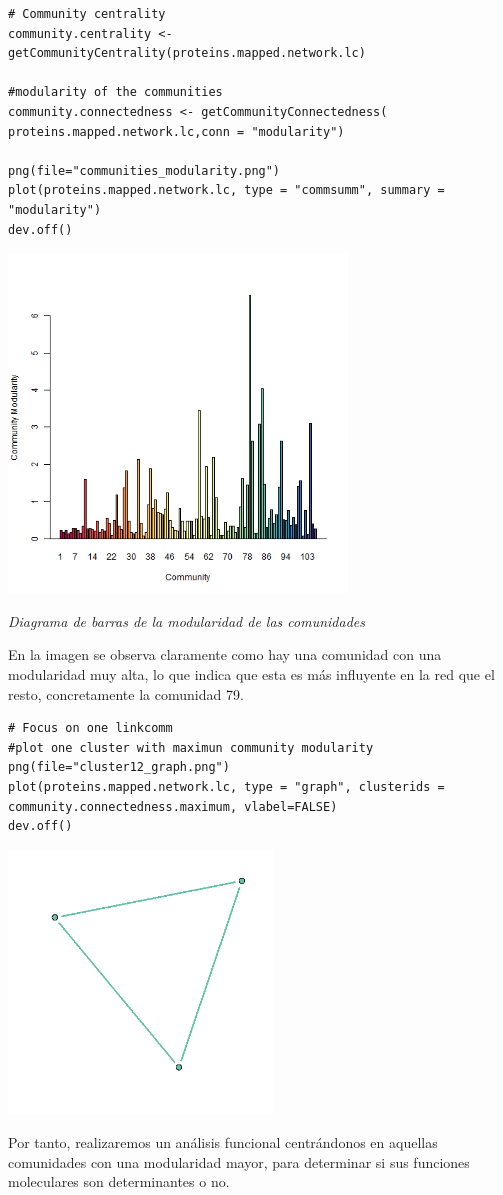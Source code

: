 \begin{lstlisting}
# Community centrality
community.centrality <- getCommunityCentrality(proteins.mapped.network.lc)

#modularity of the communities
community.connectedness <- getCommunityConnectedness(
proteins.mapped.network.lc,conn = "modularity") 

png(file="communities_modularity.png")
plot(proteins.mapped.network.lc, type = "commsumm", summary = "modularity")
dev.off()
\end{lstlisting}
\begin{center}
\includegraphics[width=90mm,scale=1]{report/figures/communities_modularity.png}

\caption{\textit{Diagrama de barras de la modularidad de las comunidades}}

\end{center}
En la imagen se observa claramente como hay una comunidad con una modularidad muy alta, lo que indica que esta es más influyente en la red que el resto, concretamente la comunidad 79.


\begin{lstlisting}
# Focus on one linkcomm
#plot one cluster with maximun community modularity
png(file="cluster12_graph.png")
plot(proteins.mapped.network.lc, type = "graph", clusterids =
community.connectedness.maximum, vlabel=FALSE)
dev.off()

\end{lstlisting}

\begin{center}
\includegraphics[width=70mm,scale=1]{report/figures/cluster_graph.png}
\end{center}

Por tanto, realizaremos un análisis funcional centrándonos en aquellas comunidades con una modularidad mayor, para determinar si sus funciones moleculares son determinantes o no.
